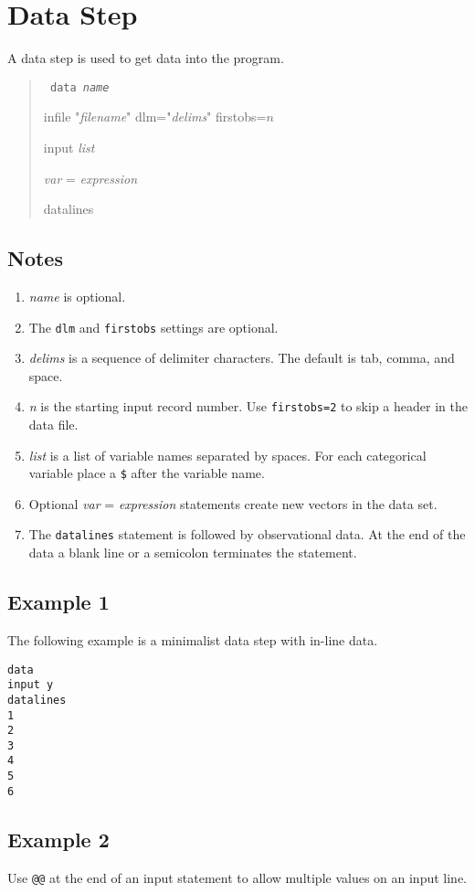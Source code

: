 \documentclass[12pt]{article}
\begin{document}
\newpage

\section{Data Step}
A data step is used to get data into the program.

\begin{quote}
{\tt
data {\it name}

infile "{\it filename}" dlm="{\it delims}" firstobs=$n$

input {\it list}

{\it var} = {\it expression}

datalines
}
\end{quote}

\subsection*{Notes}
\begin{enumerate}
\item
{\it name} is optional.
\item
The {\tt dlm} and {\tt firstobs} settings are optional.
\item
{\it delims} is a sequence of delimiter characters.
The default is tab, comma, and space.
\item
{\it n} is the starting input record number.
Use {\tt firstobs=2} to skip a header in the data file.
\item
{\it list} is a list of variable names separated by spaces.
For each categorical variable place a {\tt\$} after the variable name.
\item
Optional {\it var} = {\it expression} statements
create new vectors in the data set.
\item
The {\tt datalines} statement is followed by observational data.
At the end of the data a blank line or a semicolon terminates the
statement.
\end{enumerate}

\subsection*{Example 1}
The following example is a minimalist data step with in-line data.
\begin{Verbatim}
data
input y
datalines
1
2
3
4
5
6
\end{Verbatim}

\subsection*{Example 2}
Use \verb$@@$ at the end of an input statement to allow multiple
values on an input line.
\end{document}
